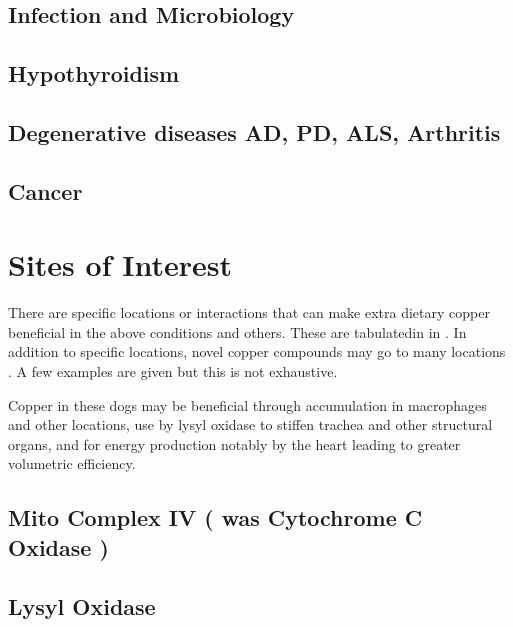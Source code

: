 \mjmdcm

\subsection{ Infection and Microbiology  }

\mjminfect

\subsection{ Hypothyroidism  }

\mjmthy

\subsection{ Degenerative diseases AD, PD, ALS, Arthritis  }

\mjmmisc

\subsection{ Cancer }

\mjmcancer

\section{ Sites of Interest }

There are specific locations or interactions
that can make extra dietary copper beneficial
in the above conditions and others.
These are  tabulatedin in .
In addition to specific locations, novel
copper compounds may go to many locations
. A  few examples are given  but this is not
exhaustive. 


Copper in these dogs may be beneficial through accumulation
in macrophages and other locations, use by lysyl oxidase to
stiffen trachea and other structural organs, and for
energy production notably by the heart leading to greater
volumetric efficiency. 

\mjmsitetab

\subsection{ Mito Complex IV ( was  Cytochrome C Oxidase )   }

\mjmcox

\subsection{ Lysyl Oxidase  }

